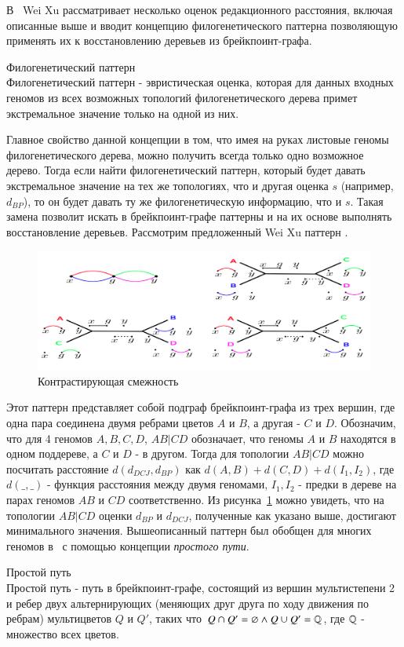 В~\cite{xu2010exploring} Wei Xu рассматривает несколько оценок редакционного расстояния, включая описанные выше
и вводит концепцию филогенетического паттерна позволяющую применять их к восстановлению деревьев из брейкпоинт-графа.
\begin{define}{Филогенетический паттерн} \\
  Филогенетический паттерн - эвристическая оценка, которая для данных входных геномов
  из всех возможных топологий филогенетического дерева примет экстремальное значение только на одной из них.
\end{define}
Главное свойство данной концепции в том, что имея на руках листовые геномы филогенетического дерева, можно получить всегда только одно возможное дерево.
Тогда если найти филогенетический паттерн, который будет давать экстремальное значение на тех же топологиях, что и другая оценка $s$ (например, $d_{BP}$),
то он будет давать ту же филогенетическую информацию, что и $s$.
Такая замена позволит искать в брейкпоинт-графе паттерны и на их основе выполнять восстановление деревьев.
Рассмотрим предложенный Wei Xu паттерн .
\begin{figure}[H]
  \centering
  \includegraphics[max width=\linewidth]{fig/2/contrasting_adjacency.png}
  \caption{Контрастирующая смежность~\cite{xu2010exploring}}
  \label{fig:contrasting_adjacency}
\end{figure}
Этот паттерн представляет собой подграф брейкпоинт-графа из трех вершин, где одна пара соединена двумя ребрами цветов $A$ и $B$, а другая - $C$ и $D$.
Обозначим, что для 4 геномов $A, B, C, D$, $AB|CD$ обозначает, что геномы $A$ и $B$ находятся в одном поддереве, а $C$ и $D$ - в другом.
Тогда для топологии $AB|CD$ можно посчитать расстояние $d (d_{DCJ}, d_{BP})$ как $d(A, B) + d(C, D) + d(I_1, I_2)$,
где $d(\_, \_)$ - функция расстояния между двумя геномами, $I_1, I_2$ - предки в дереве на парах геномов $AB$ и $CD$ соответственно.
Из рисунка~\ref{fig:contrasting_adjacency} можно увидеть, что на топологии $AB|CD$ оценки $d_{BP}$ и $d_{DCJ}$, полученные как указано выше, достигают минимального значения.
Вышеописанный паттерн был обобщен для многих геномов в~\cite{Alekseyev2009} с помощью концепции \textit{простого пути}.
\begin{define}{Простой путь} \\
  Простой путь - путь в брейкпоинт-графе, состоящий из вершин мультистепени 2 и ребер двух альтернирующих
  (меняющих друг друга по ходу движения по ребрам) мультицветов $Q$ и $Q'$, таких что $Q \cap Q' = \varnothing \land Q \cup Q' = \mathbb{Q}$,
  где $\mathbb{Q}$ - множество всех цветов.
\end{define}


